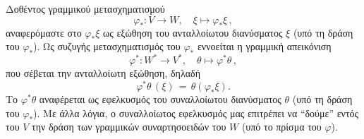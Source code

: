 \documentclass[11pt,a4paper,twoside,openright]{book}
\begin{document}
Δοθέντος γραμμικού μετασχηματισμού
\begin{equation}\label{eq:linear-differential}
\varphi_*: V \to W,\quad \xi \mapsto \varphi_* \xi\,,
\end{equation}
αναφερόμαστε στο $\varphi_* \xi$ ως
εξώθηση του ανταλλοίωτου διανύσματος $\xi$
(υπό τη δράση του $\varphi_*$).
Ως συζυγής μετασχηματισμός του $\varphi_*$
εννοείται η γραμμική απεικόνιση
\begin{equation}\label{eq:linear-differential-adjoint}
\varphi^*: W^* \to V^*,\quad \theta \mapsto \varphi^* \theta\,,
\end{equation}
που σέβεται την ανταλλοίωτη εξώθηση,
δηλαδή
\begin{equation}\label{eq:linear-differential-adjoint-eval}
\varphi^*\theta\,(\xi) \,=\, \theta \left(\varphi_* \xi \right).
\end{equation}
Το $\varphi^* \theta$ αναφέρεται ως
εφελκυσμός του συναλλοίωτου διανύσματος $\theta$
(υπό τη δράση του $\varphi_*$).
Με άλλα λόγια,
ο συναλλοίωτος εφελκυσμός μας επιτρέπει να ``δούμε''
εντός του $V$ την δράση των γραμμικών συναρτησοειδών του $W$
(υπό το πρίσμα του $\varphi$).
\end{document}
